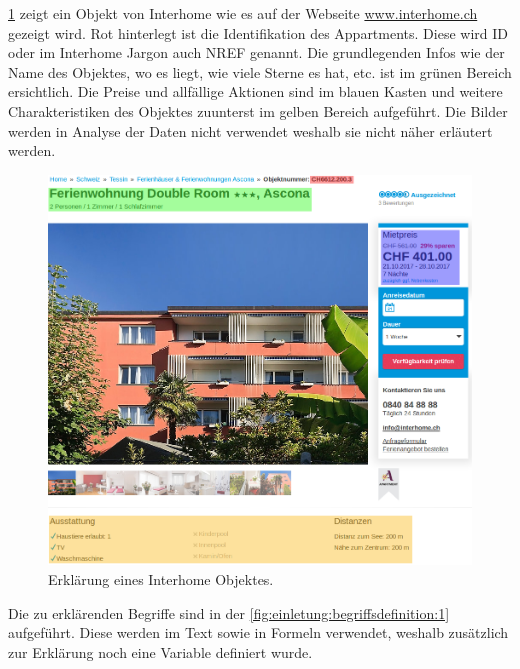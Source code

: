 \cref{fig:einletung:begriffsdefinition:2} zeigt ein Objekt von Interhome wie es auf der Webseite \href{https://www.interhome.ch/de}{www.interhome.ch} gezeigt wird. Rot hinterlegt ist die Identifikation des Appartments. Diese wird ID oder im Interhome Jargon auch NREF genannt. Die grundlegenden Infos wie der Name des Objektes, wo es liegt, wie viele Sterne es hat, etc. ist im grünen Bereich ersichtlich. Die Preise und allfällige Aktionen sind im blauen Kasten und weitere Charakteristiken des Objektes zuunterst im gelben Bereich aufgeführt. Die Bilder werden in Analyse der Daten nicht verwendet weshalb sie nicht näher erläutert werden.
\begin{figure}[h]
	\centering
	\includegraphics[width=1\textwidth]{images/interhome-object}
	\caption{Erklärung eines Interhome Objektes.}
	\label{fig:einletung:begriffsdefinition:2}
\end{figure}

Die zu erklärenden Begriffe sind in der \cref{fig:einletung:begriffsdefinition:1} aufgeführt. Diese werden im Text sowie in Formeln verwendet, weshalb zusätzlich zur Erklärung noch eine Variable definiert wurde.

